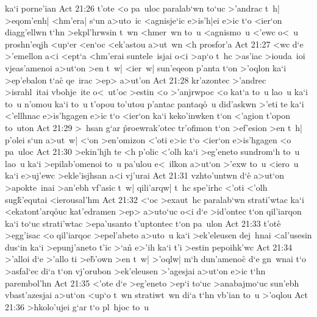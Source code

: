 ka`i
porne'ian\bibvsend
\vs Act 21:26
t'ote
<o
pa~uloc
paralab`wn
to`uc
>'andrac
t~h|
>eqom'enh|
<hm'era|
s`un
a>uto~ic
<agnisje`ic
e>is'h|ei
e>ic
t`o
<ier`on
diagg'ellwn
t`hn
>ekpl'hrwsin
t~wn
<hmer~wn
to~u
<agnismo~u
<'ewc
o<~u
proshn'eqjh
<up`er
<en`oc
<ek'astou
a>ut~wn
<h
prosfor'a\bibvsend
\vs Act 21:27
<wc
d`e
>'emellon
a<i
<ept`a
<hm'erai
suntele~isjai
o<i
>ap`o
t~hc
>as'iac
>iouda~ioi
vjeas'amenoi
a>ut`on
>en
t~w|
<ier~w|
sun'eqeon
p'anta
t`on
>'oqlon
ka`i
>ep'ebalon
t`ac\r{}
qe~irac
>ep>
a>ut'on\bibvsend
\vs Act 21:28
kr'azontec
>'andrec
>israhl~itai
vbohje~ite
o<~ut'oc
>estin
<o
>'anjrwpoc
<o
kat`a
to~u
lao~u
ka`i
to~u
n'omou
ka`i
to~u
t'opou
to'utou
p'antac
pantaq\r{o}~u
did'askwn
>'eti
te
ka`i
<'ellhnac
e>is'hgagen
e>ic
t`o
<ier`on
ka`i
keko'inwken
t`on
<'agion
t'opon
to~uton\bibvsend
\vs Act 21:29
>~hsan
g`ar
\r{p}roewrak'otec
tr'ofimon
t`on
>ef'esion
>en
t~h|
p'olei
s`un
a>ut~w|
<`on
>en'omizon
<'oti
e>ic
t`o
<ier`on
e>is'hgagen
<o
pa~uloc\bibvsend
\vs Act 21:30
>ekin'hjh
te
<h
p'olic
<'olh
ka`i
>eg'eneto
sundrom`h
to~u
lao~u
ka`i
>epilab'omenoi
to~u
pa'ulou
e<~ilkon
a>ut`on
>'exw
to~u
<iero~u
ka`i
e>uj'ewc
>ekle'isjhsan
a<i
vj'urai\bibvsend
\vs Act 21:31
vzhto'untwn
d`e\r{}
a>ut`on
>apokte~inai
>an'ebh
vf'asic
t~w|
qili'arqw|
t~hc
spe'irhc
<'oti
<'olh
sug\r{k}'equtai
<ierousal'hm\bibvsend
\vs Act 21:32
<`oc
>exaut~hc
paralab`wn
strati'wtac
ka`i
<ekatont'arq\r{o}uc
kat'edramen
>ep>
a>uto`uc
o<i
d`e
>id'ontec
t`on
qil'iarqon
ka`i
to`uc
strati'wtac
>epa'usanto
t'uptontec
t`on
pa~ulon\bibvsend
\vs Act 21:33
t'ote\r{}
>egg'isac
<o
qil'iarqoc
>epel'abeto
a>uto~u
ka`i
>ek'eleusen
dej~hnai
<al'usesin
dus`in
ka`i
>epunj'aneto
t'ic
>`a\r{n}
e>'ih
ka`i
t'i
>estin
pepoihk'wc\bibvsend
\vs Act 21:34
>'alloi
d`e
>'allo
ti
>e\r{b}'own
>en
t~w|
>'oqlw|
m`h
dun'amenoc\r{}
d`e
gn~wnai
t`o
>asfal`ec
di`a
t`on
vj'orubon
>ek'eleusen
>'agesjai
a>ut`on
e>ic
t`hn
parembol'hn\bibvsend
\vs Act 21:35
<'ote
d`e
>eg'eneto
>ep`i
to`uc
>anabajmo`uc
sun'ebh
vbast'azesjai
a>ut`on
<up`o
t~wn
stratiwt~wn
di`a
t`hn
vb'ian
to~u
>'oqlou\bibvsend
\vs Act 21:36
>hkolo'ujei
g`ar
t`o
pl~hjoc
to~u
